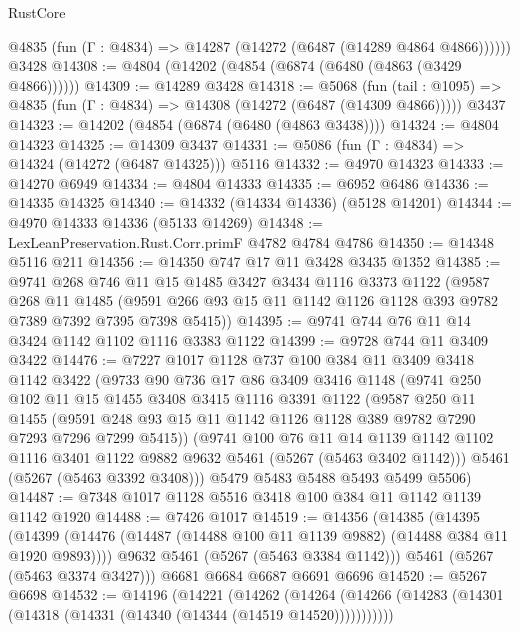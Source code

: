 \begin{lexlean}{RustCore}
\begin{coremodule}
      @4835 (fun (Γ : @4834) => @14287 (@14272 (@6487 (@14289 @4864 @4866))))))
    @3428
@14308 := @4804 (@14202 (@4854 (@6874 (@6480 (@4863 (@3429 @4866))))))
@14309 := @14289 @3428
@14318 := @5068
    (fun (tail : @1095) => @4835 (fun (Γ : @4834) => @14308 (@14272 (@6487 (@14309 @4866)))))
    @3437
@14323 := @14202 (@4854 (@6874 (@6480 (@4863 @3438))))
@14324 := @4804 @14323
@14325 := @14309 @3437
@14331 := @5086 (fun (Γ : @4834) => @14324 (@14272 (@6487 @14325))) @5116
@14332 := @4970 @14323
@14333 := @14270 @6949
@14334 := @4804 @14333
@14335 := @6952 @6486
@14336 := @14335 @14325
@14340 := @14332 (@14334 @14336) (@5128 @14201)
@14344 := @4970 @14333 @14336 (@5133 @14269)
@14348 := LexLeanPreservation.Rust.Corr.primF @4782 @4784 @4786
@14350 := @14348 @5116 @211
@14356 := @14350 @747 @17 @11 @3428 @3435 @1352
@14385 := @9741
    @268
    @746
    @11
    @15
    @1485
    @3427
    @3434
    @1116
    @3373
    @1122
    (@9587
      @268
      @11
      @1485
      (@9591 @266 @93 @15 @11 @1142 @1126 @1128 @393 @9782 @7389 @7392 @7395 @7398 @5415))
@14395 := @9741 @744 @76 @11 @14 @3424 @1142 @1102 @1116 @3383 @1122
@14399 := @9728 @744 @11 @3409 @3422
@14476 := @7227
    @1017
    @1128
    @737
    @100
    @384
    @11
    @3409
    @3418
    @1142
    @3422
    (@9733
      @90
      @736
      @17
      @86
      @3409
      @3416
      @1148
      (@9741
        @250
        @102
        @11
        @15
        @1455
        @3408
        @3415
        @1116
        @3391
        @1122
        (@9587
          @250
          @11
          @1455
          (@9591 @248 @93 @15 @11 @1142 @1126 @1128 @389 @9782 @7290 @7293 @7296 @7299 @5415))
        (@9741
          @100
          @76
          @11
          @14
          @1139
          @1142
          @1102
          @1116
          @3401
          @1122
          @9882
          @9632
          @5461
          (@5267 (@5463 @3402 @1142)))
        @5461
        (@5267 (@5463 @3392 @3408)))
      @5479
      @5483
      @5488
      @5493
      @5499
      @5506)
@14487 := @7348 @1017 @1128 @5516 @3418 @100 @384 @11 @1142 @1139 @1142 @1920
@14488 := @7426 @1017
@14519 := @14356
    (@14385
      (@14395
        (@14399 (@14476 (@14487 (@14488 @100 @11 @1139 @9882) (@14488 @384 @11 @1920 @9893))))
        @9632
        @5461
        (@5267 (@5463 @3384 @1142)))
      @5461
      (@5267 (@5463 @3374 @3427)))
    @6681
    @6684
    @6687
    @6691
    @6696
@14520 := @5267 @6698
@14532 := @14196
    (@14221
      (@14262
        (@14264 (@14266 (@14283 (@14301 (@14318 (@14331 (@14340 (@14344 (@14519 @14520)))))))))))

\end{coremodule}
\end{lexlean}
